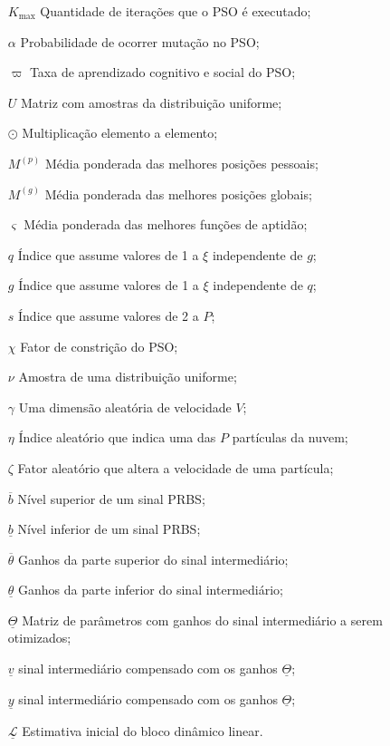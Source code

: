 \begin{itemize}[leftmargin=30pt,labelsep=1em,align=left]
	\item[$K_{\max}$] Quantidade de iterações que o PSO é executado;
	\item[$\alpha$] Probabilidade de ocorrer mutação no PSO;
	\item[$\varpi$] Taxa de aprendizado cognitivo e social do PSO;
	\item[$U$] Matriz com amostras da distribuição uniforme;
	\item[$\odot$] Multiplicação elemento a elemento;
	\item[$M^{(p)}$] Média ponderada das melhores posições pessoais;
	\item[$M^{(g)}$] Média ponderada das melhores posições globais;
	\item[$\varsigma$] Média ponderada das melhores funções de aptidão;
	\item[$q$] Índice que assume valores de 1 a $\xi$ independente de $g$;
	\item[$g$] Índice que assume valores de 1 a $\xi$ independente de $q$;
	\item[$s$] Índice que assume valores de 2 a $P$;
	\item[$\chi$] Fator de constrição do PSO;
	\item[$\nu$] Amostra de uma distribuição uniforme;
	\item[$\gamma$] Uma dimensão aleatória de velocidade $V$;
	\item[$\eta$] Índice aleatório que indica uma das $P$ partículas da nuvem;
	\item[$\zeta$] Fator aleatório que altera a velocidade de uma partícula;
	\item[$\overline{b}$] Nível superior de um sinal PRBS;
	\item[$\underline{b}$] Nível inferior de um sinal PRBS;
	\item[$\overline{\theta}$] Ganhos da parte superior do sinal intermediário;
	\item[$\underline{\theta}$] Ganhos da parte inferior do sinal intermediário;
	\item[$\underline{\Theta}$] Matriz de parâmetros com ganhos do sinal intermediário a serem otimizados;
	\item[$\underline{v}$] sinal intermediário compensado com os ganhos $\underline{\Theta}$;
	\item[$\underline{y}$] sinal intermediário compensado com os ganhos $\underline{\Theta}$;
	\item[$\underline{\mathcal{L}}$] Estimativa inicial do bloco dinâmico linear.
\end{itemize}

